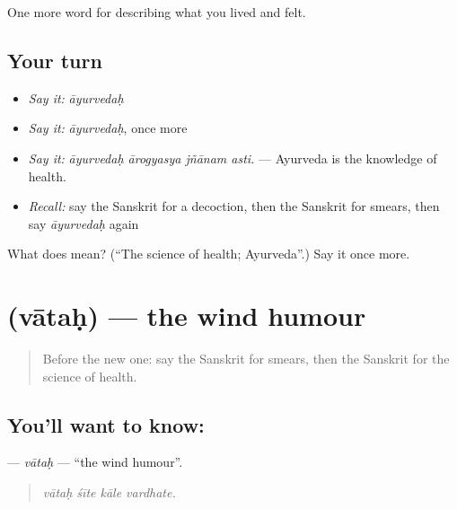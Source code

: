 \begin{grammarlens}[title={What you've built}]
One more word for describing what you lived and felt.
\end{grammarlens}

\subsection*{Your turn}
\begin{itemize}
\raggedright
  \item \emph{Say it:} \emph{āyurvedaḥ}
  \item \emph{Say it:} \emph{āyurvedaḥ}, once more
  \item \emph{Say it:} \emph{āyurvedaḥ ārogyasya jñānam asti.} — Ayurveda is the knowledge of health.
  \item \emph{Recall:} say the Sanskrit for a decoction, then the Sanskrit for smears, then say \emph{āyurvedaḥ} again
\end{itemize}

\begin{tcolorbox}[breakable,colback=teal!4,colframe=teal!35!black,title={Before you move on}]
What does  mean? (\textquotedblleft{}The science of health; Ayurveda\textquotedblright{}.) Say it once more.
\end{tcolorbox}
\section[\texorpdfstring{\sk{वातः} (vātaḥ)}{वातः (vātaḥ)}]{ (vātaḥ) — the wind humour}

\label{lesson:SA-C484-vatah}



\begin{quote}
Before the new one: say the Sanskrit for smears, then the Sanskrit for the science of health.
\end{quote}

\subsection*{You'll want to know: }
\textbf{} — \emph{vātaḥ} — \textquotedblleft{}the wind humour\textquotedblright{}.

\begin{quote}
   
\end{quote}

\begin{quote}
\emph{vātaḥ śīte kāle vardhate.}
\end{quote}

